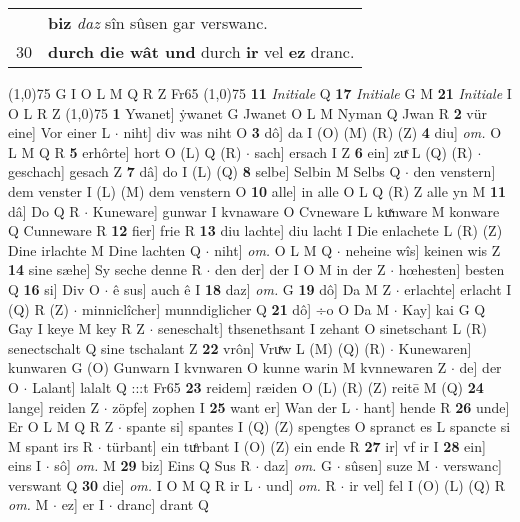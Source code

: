 \documentclass[8pt,a4paper,notitlepage]{article}
\begin{document}
\begin{table}[ht]
\begin{minipage}[t]{0.5\linewidth}
\begin{tabular}{rl}
 & \textbf{biz} \textit{daz} sîn sûsen gar verswanc.\\ 
30 & \textbf{durch die wât und} durch \textbf{ir} vel \textbf{ez} dranc.\\ 
\end{tabular}
\scriptsize
\line(1,0){75} \newline
G I O L M Q R Z Fr65 \newline
\line(1,0){75} \newline
\textbf{11} \textit{Initiale} Q  \textbf{17} \textit{Initiale} G M  \textbf{21} \textit{Initiale} I O L R Z  \newline
\line(1,0){75} \newline
\textbf{1} Ywanet] ẏwanet G Jwanet O L M Nyman Q Jwan R \textbf{2} vür eine] Vor einer L  $\cdot$ niht] div was niht O \textbf{3} dô] da I (O) (M) (R) (Z) \textbf{4} diu] \textit{om.} O L M Q R \textbf{5} erhôrte] hort O (L) Q (R)  $\cdot$ sach] ersach I Z \textbf{6} ein] zuͯ L (Q) (R)  $\cdot$ geschach] gesach Z \textbf{7} dâ] do I (L) (Q) \textbf{8} selbe] Selbin M Selbs Q  $\cdot$ den venstern] dem venster I (L) (M) dem venstern O \textbf{10} alle] in alle O L Q (R) Z alle yn M \textbf{11} dâ] Do Q R  $\cdot$ Kuneware] gunwar I kvnaware O Cvneware L kuͯnware M konware Q Cunneware R \textbf{12} fier] frie R \textbf{13} diu lachte] diu lacht I Die enlachete L (R) (Z) Dine irlachte M Dine lachten Q  $\cdot$ niht] \textit{om.} O L M Q  $\cdot$ neheine wîs] keinen wis Z \textbf{14} sine sæhe] Sy seche denne R  $\cdot$ den der] der I O M in der Z  $\cdot$ hœhesten] besten Q \textbf{16} si] Div O  $\cdot$ ê sus] auch ê I \textbf{18} daz] \textit{om.} G \textbf{19} dô] Da M Z  $\cdot$ erlachte] erlacht I (Q) R (Z)  $\cdot$ minniclîcher] munndiglicher Q \textbf{21} dô] ÷o O Da M  $\cdot$ Kay] kai G Q Gay I keye M key R Z  $\cdot$ seneschalt] thsenethsant I zehant O sinetschant L (R) senectschalt Q sine tschalant Z \textbf{22} vrôn] Vruͯw L (M) (Q) (R)  $\cdot$ Kunewaren] kunwaren G (O) Gunwarn I kvnwaren O kunne warin M kvnnewaren Z  $\cdot$ de] der O  $\cdot$ Lalant] lalalt Q :::t Fr65 \textbf{23} reidem] ræiden O (L) (R) (Z) reitē M (Q) \textbf{24} lange] reiden Z  $\cdot$ zöpfe] zophen I \textbf{25} want er] Wan der L  $\cdot$ hant] hende R \textbf{26} unde] Er O L M Q R Z  $\cdot$ spante si] spantes I (Q) (Z) spengtes O spranct es L spancte si M spant irs R  $\cdot$ türbant] ein tuͤrbant I (O) (Z) ein ende R \textbf{27} ir] vf ir I \textbf{28} ein] eins I  $\cdot$ sô] \textit{om.} M \textbf{29} biz] Eins Q Sus R  $\cdot$ daz] \textit{om.} G  $\cdot$ sûsen] suze M  $\cdot$ verswanc] verswant Q \textbf{30} die] \textit{om.} I O M Q R ir L  $\cdot$ und] \textit{om.} R  $\cdot$ ir vel] fel I (O) (L) (Q) R \textit{om.} M  $\cdot$ ez] er I  $\cdot$ dranc] drant Q \newline

\end{minipage}
\end{table}
\end{document}
